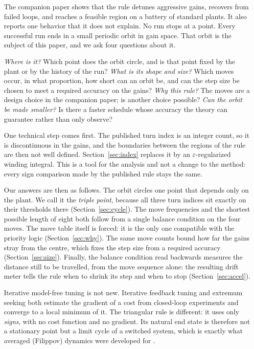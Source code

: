 \documentclass[letterpaper, 10pt, conference, twocolumn]{ieeeconf}
\begin{document}
The companion paper shows that the rule detunes aggressive gains, recovers
from failed loops, and reaches a feasible region on a battery of standard
plants. It also reports one behavior that it does not explain. No run stops at
a point. Every successful run ends in a small periodic orbit in gain space.
That orbit is the subject of this paper, and we ask four questions about it.

\emph{Where is it?} Which point does the orbit circle, and is that point
fixed by the plant or by the history of the run? \emph{What is its shape and
size?} Which moves occur, in what proportion, how short can an orbit be, and
can the step size be chosen to meet a required accuracy on the gains?
\emph{Why this rule?} The moves are a design choice in the companion paper;
is another choice possible? \emph{Can the orbit be made smaller?} Is there a
faster schedule whose accuracy the theory can guarantee rather than only
observe?

One technical step comes first. The published turn index is an integer count,
so it is discontinuous in the gains, and the boundaries between the regions of
the rule are then not well defined. Section~\ref{sec:index} replaces it by an
$\varepsilon$-regularized winding integral. This is a tool for the analysis and
not a change to the method: every sign comparison made by the published rule
stays the same.

Our answers are then as follows. The orbit circles one point that depends only
on the plant. We call it the \emph{triple point}, because all three turn
indices sit exactly on their thresholds there (Section~\ref{sec:cycle}). The
move frequencies and the shortest possible length of eight both follow from a
single balance condition on the four moves. The move table itself is forced: it
is the only one compatible with the priority logic (Section~\ref{sec:why}).
The same move counts bound how far the gains stray from the centre, which fixes
the step size from a required accuracy (Section~\ref{sec:size}). Finally, the
balance condition read backwards measures the distance still to be travelled,
from the move sequence alone: the resulting drift meter tells the rule when to
shrink its step and when to stop (Section~\ref{sec:accel}).

Iterative model-free tuning is not new. Iterative feedback tuning
\cite{Hjalmarsson1998} and extremum seeking \cite{Killingsworth2006} both
estimate the gradient of a cost from closed-loop experiments and converge to a
local minimum of it. The triangular rule is different: it uses only
\emph{signs}, with no cost function and no gradient. Its natural end state is
therefore not a stationary point but a limit cycle of a switched system, which
is exactly what averaged (Filippov) dynamics were developed for
\cite{Filippov1988}.
\end{document}
